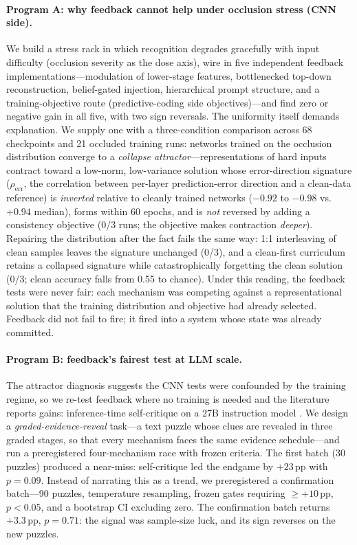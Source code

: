 \documentclass[10pt]{article}
\newcommand{\rhoerr}{\rho_{\mathrm{err}}}
\begin{document}
\paragraph{Program A: why feedback cannot help under occlusion stress
(CNN side).}
We build a stress rack in which recognition degrades gracefully with input
difficulty (occlusion severity as the dose axis), wire in five independent
feedback implementations---modulation of lower-stage features, bottlenecked
top-down reconstruction, belief-gated injection, hierarchical prompt
structure, and a training-objective route (predictive-coding side
objectives)---and find zero or negative gain in all five, with two
sign reversals. The uniformity itself demands explanation. We supply one
with a three-condition comparison across 68 checkpoints and 21 occluded
training runs: networks trained on the occlusion distribution converge to a
\emph{collapse attractor}---representations of hard inputs contract toward
a low-norm, low-variance solution whose error-direction signature
($\rhoerr$, the correlation between per-layer prediction-error direction
and a clean-data reference) is \emph{inverted} relative to cleanly trained
networks ($-0.92$ to $-0.98$ vs.\ $+0.94$ median), forms within 60 epochs,
and is \emph{not} reversed by adding a consistency objective (0/3 runs;
the objective makes contraction \emph{deeper}). Repairing the distribution
after the fact fails the same way: 1:1 interleaving of clean samples leaves
the signature unchanged (0/3), and a clean-first curriculum retains a
collapsed signature while catastrophically forgetting the clean solution
(0/3; clean accuracy falls from 0.55 to chance). Under this reading, the
feedback tests were never fair: each mechanism was competing against a
representational solution that the training distribution and objective had
already selected. Feedback did not fail to fire; it fired into a system
whose state was already committed.

\paragraph{Program B: feedback's fairest test at LLM scale.}
The attractor diagnosis suggests the CNN tests were confounded by the
training regime, so we re-test feedback where no training is needed and the
literature reports gains: inference-time self-critique on a 27B instruction
model \citep{qwen2.5}. We design a \emph{graded-evidence-reveal} task---a
text puzzle whose clues are revealed in three graded stages, so that every
mechanism faces the same evidence schedule---and run a preregistered
four-mechanism race with frozen criteria. The first batch (30 puzzles)
produced a near-miss: self-critique led the endgame by $+23$\,pp with
$p = 0.09$. Instead of narrating this as a trend, we preregistered a
confirmation batch---90 puzzles, temperature resampling, frozen gates
requiring $\ge +10$\,pp, $p < 0.05$, and a bootstrap CI excluding zero.
The confirmation batch returns $+3.3$\,pp, $p = 0.71$: the signal was
sample-size luck, and its sign reverses on the new puzzles.
\end{document}
